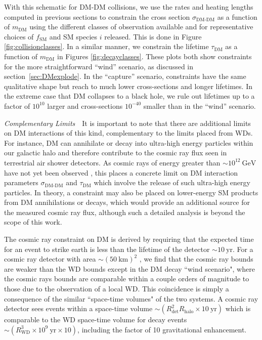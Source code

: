\documentclass[twocolumn, preprintnumbers,amsmath,amssymb,prd, superscriptaddress]{revtex4}
\newcommand{\GeV}{\text{GeV}}
\begin{document}
With this schematic for DM-DM collisions, we use the rates and heating lengths computed in previous sections to constrain the cross section $\sigma_\text{DM-DM}$ as a function of $m_\text{DM}$ using the different classes of observation available and for representative choices of $f_\text{SM}$ and SM species $i$ released.
This is done in Figure \ref{fig:collisionclasses}.
In a similar manner, we constrain the lifetime $\tau_\text{DM}$ as a function of $m_\text{DM}$ in Figures \ref{fig:decayclasses}.
These plots both show constraints for the more straightforward ``wind'' scenario, as discussed in section~\ref{sec:DMexplode}. 
In the ``capture'' scenario, constraints have the same qualitative shape but reach to much lower cross-sections and longer lifetimes. 
In the extreme case that DM collapses to a black hole, we rule out lifetimes up to a factor of $10^{10}$ larger and cross-sections $10^{-40}$ smaller than in the ``wind'' scenario.

\emph{Complementary Limits}~~It is important to note that there are additional limits on DM interactions of this kind, complementary to the limits placed from WDs.
For instance, DM can annihilate or decay into ultra-high energy particles within our galactic halo and therefore contribute to the cosmic ray flux seen in terrestrial air shower detectors.
As cosmic rays of energy greater than $\sim 10^{12} ~\GeV$ have not yet been observed \cite{ThePierreAuger:2015rha, AbuZayyad:2012ru}, this places a concrete limit on DM interaction parameters $\sigma_\text{DM-DM}$ and $\tau_\text{DM}$ which involve the release of such ultra-high energy particles.
In theory, a constraint may also be placed on lower-energy SM products from DM annihilations or decays, which would provide an additional source for the measured cosmic ray flux, although such a detailed analysis is beyond the scope of this work.

The cosmic ray constraint on DM is derived by requiring that the expected time for an event to strike earth is less than the lifetime of the detector $\sim 10 ~\text{yr}$.
For a cosmic ray detector with area $ \sim (50~\text{km})^2$ \cite{ThePierreAuger:2015rha}, we find that the cosmic ray bounds are weaker than the WD bounds except in the DM decay ``wind scenario", where the cosmic rays bounds are comparable within a couple orders of magnitude to those due to the observation of a local WD.
This coincidence is simply a consequence of the similar ``space-time volumes" of the two systems.
A cosmic ray detector sees events within a space-time volume $\sim (R_\text{det}^2 R_\text{halo} \times 10 ~\text{yr})$ which is comparable to the WD space-time volume for decay events $\sim (R_\text{WD}^3 \times 10^9 ~\text{yr}\times 10)$, including the factor of 10 gravitational enhancement.
\end{document}
